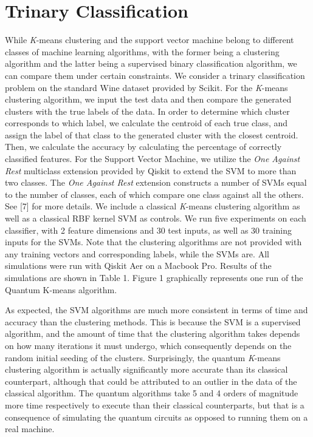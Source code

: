\documentclass[twocolumn, english]{revtex4-2}
\numberwithin{equation}{section}
\begin{document}
\section{Trinary Classification}
While \textit{K}-means clustering and the support vector machine belong to different classes of machine learning algorithms, with the former being a clustering algorithm and the latter being a supervised binary classification algorithm, we can compare them under certain constraints. We consider a trinary classification problem on the standard Wine dataset provided by Scikit. For the \textit{K}-means clustering algorithm, we input the test data and then compare the generated clusters with the true labels of the data. In order to determine which cluster corresponds to which label, we calculate the centroid of each true class, and assign the label of that class to the generated cluster with the closest centroid. Then, we calculate the accuracy by calculating the percentage of correctly classified features. For the Support Vector Machine, we utilize the \textit{One Against Rest} multiclass extension provided by Qiskit to extend the SVM to more than two classes. The \textit{One Against Rest} extension constructs a number of SVMs equal to the number of classes, each of which compare one class against all the others. See [7] for more details. We include a classical \textit{K}-means clustering algorithm as well as a classical RBF kernel SVM as controls. We run five experiments on each classifier, with 2 feature dimensions and 30 test inputs, as well as 30 training inputs for the SVMs. Note that the clustering algorithms are not provided with any training vectors and corresponding labels, while the SVMs are. All simulations were run with Qiskit Aer on a Macbook Pro. Results of the simulations are shown in Table 1. Figure 1 graphically represents one run of the Quantum K-means algorithm.

As expected, the SVM algorithms are much more consistent in terms of time and accuracy than the clustering methods. This is because the SVM is a supervised algorithm, and the amount of time that the clustering algorithm takes depends on how many iterations it must undergo, which consequently depends on the random initial seeding of the clusters. Surprisingly, the quantum \textit{K}-means clustering algorithm is actually significantly more accurate than its classical counterpart, although that could be attributed to an outlier in the data of the classical algorithm. The quantum algorithms take 5 and 4 orders of magnitude more time respectively to execute than their classical counterparts, but that is a consequence of simulating the quantum circuits as opposed to running them on a real machine.
\end{document}
